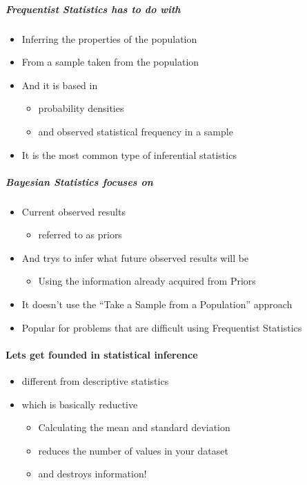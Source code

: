 \documentclass[]{article}
\providecommand{\tightlist}{%
  \setlength{\itemsep}{0pt}\setlength{\parskip}{0pt}}
\let\oldparagraph\paragraph
\renewcommand{\paragraph}[1]{\oldparagraph{#1}\mbox{}}
\let\oldsubparagraph\subparagraph
\renewcommand{\subparagraph}[1]{\oldsubparagraph{#1}\mbox{}}
\begin{document}
\subparagraph{Frequentist Statistics has to do
with}\label{frequentist-statistics-has-to-do-with}

\begin{itemize}
\tightlist
\item
  Inferring the properties of the population
\item
  From a sample taken from the population
\item
  And it is based in

  \begin{itemize}
  \tightlist
  \item
    probability densities
  \item
    and observed statistical frequency in a sample
  \end{itemize}
\item
  It is the most common type of inferential statistics
\end{itemize}

\subparagraph{Bayesian Statistics focuses
on}\label{bayesian-statistics-focuses-on}

\begin{itemize}
\tightlist
\item
  Current observed results

  \begin{itemize}
  \tightlist
  \item
    referred to as priors
  \end{itemize}
\item
  And trys to infer what future observed results will be

  \begin{itemize}
  \tightlist
  \item
    Using the information already acquired from Priors
  \end{itemize}
\item
  It doesn't use the ``Take a Sample from a Population'' approach
\item
  Popular for problems that are difficult using Frequentist Statistics
\end{itemize}

\paragraph{Lets get founded in statistical
inference}\label{lets-get-founded-in-statistical-inference}

\begin{itemize}
\tightlist
\item
  different from descriptive statistics
\item
  which is basically reductive

  \begin{itemize}
  \tightlist
  \item
    Calculating the mean and standard deviation
  \item
    reduces the number of values in your dataset
  \item
    and destroys information!
  \end{itemize}
\end{itemize}
\end{document}
